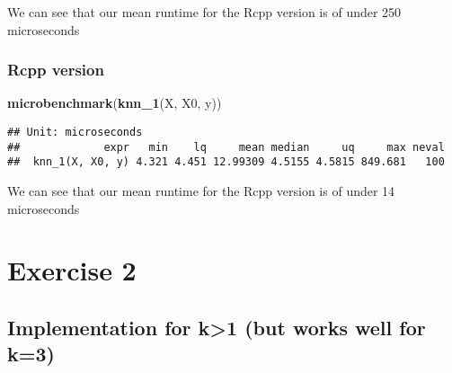 \documentclass[]{article}
\newenvironment{Shaded}{\begin{snugshade}}{\end{snugshade}}
\newcommand{\KeywordTok}[1]{\textcolor[rgb]{0.13,0.29,0.53}{\textbf{#1}}}
\newcommand{\NormalTok}[1]{#1}
\begin{document}
We can see that our mean runtime for the Rcpp version is of under 250
microseconds

\hypertarget{rcpp-version}{%
\subsubsection{Rcpp version}\label{rcpp-version}}

\begin{Shaded}
\begin{Highlighting}[]
\KeywordTok{microbenchmark}\NormalTok{(}\KeywordTok{knn_1}\NormalTok{(X, X0, y))}
\end{Highlighting}
\end{Shaded}

\begin{verbatim}
## Unit: microseconds
##             expr   min    lq     mean median     uq     max neval
##  knn_1(X, X0, y) 4.321 4.451 12.99309 4.5155 4.5815 849.681   100
\end{verbatim}

We can see that our mean runtime for the Rcpp version is of under 14
microseconds

\newpage

\hypertarget{exercise-2}{%
\section{Exercise 2}\label{exercise-2}}

\hypertarget{implementation-for-k1-but-works-well-for-k3}{%
\subsection{Implementation for k\textgreater{}1 (but works well for
k=3)}\label{implementation-for-k1-but-works-well-for-k3}}
\end{document}

